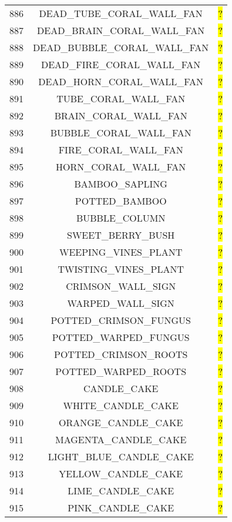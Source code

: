 \documentclass[11pt]{article}
\newcommand\myworries[1]{\sethlcolor{red}\hl{#1}}
\begin{document}
\begin{longtable}{ |c|c|c| }
	886 & DEAD\_TUBE\_CORAL\_WALL\_FAN & \myworries{?} \\
	887 & DEAD\_BRAIN\_CORAL\_WALL\_FAN & \myworries{?} \\
	888 & DEAD\_BUBBLE\_CORAL\_WALL\_FAN & \myworries{?} \\
	889 & DEAD\_FIRE\_CORAL\_WALL\_FAN & \myworries{?} \\
	890 & DEAD\_HORN\_CORAL\_WALL\_FAN & \myworries{?} \\
	891 & TUBE\_CORAL\_WALL\_FAN & \myworries{?} \\
	892 & BRAIN\_CORAL\_WALL\_FAN & \myworries{?} \\
	893 & BUBBLE\_CORAL\_WALL\_FAN & \myworries{?} \\
	894 & FIRE\_CORAL\_WALL\_FAN & \myworries{?} \\
	895 & HORN\_CORAL\_WALL\_FAN & \myworries{?} \\
	896 & BAMBOO\_SAPLING & \myworries{?} \\
	897 & POTTED\_BAMBOO & \myworries{?} \\
	898 & BUBBLE\_COLUMN & \myworries{?} \\
	899 & SWEET\_BERRY\_BUSH & \myworries{?} \\
	900 & WEEPING\_VINES\_PLANT & \myworries{?} \\
	901 & TWISTING\_VINES\_PLANT & \myworries{?} \\
	902 & CRIMSON\_WALL\_SIGN & \myworries{?} \\
	903 & WARPED\_WALL\_SIGN & \myworries{?} \\
	904 & POTTED\_CRIMSON\_FUNGUS & \myworries{?} \\
	905 & POTTED\_WARPED\_FUNGUS & \myworries{?} \\
	906 & POTTED\_CRIMSON\_ROOTS & \myworries{?} \\
	907 & POTTED\_WARPED\_ROOTS & \myworries{?} \\
	908 & CANDLE\_CAKE & \myworries{?} \\
	909 & WHITE\_CANDLE\_CAKE & \myworries{?} \\
	910 & ORANGE\_CANDLE\_CAKE & \myworries{?} \\
	911 & MAGENTA\_CANDLE\_CAKE & \myworries{?} \\
	912 & LIGHT\_BLUE\_CANDLE\_CAKE & \myworries{?} \\
	913 & YELLOW\_CANDLE\_CAKE & \myworries{?} \\
	914 & LIME\_CANDLE\_CAKE & \myworries{?} \\
	915 & PINK\_CANDLE\_CAKE & \myworries{?} \\

\end{longtable}
\end{document}
